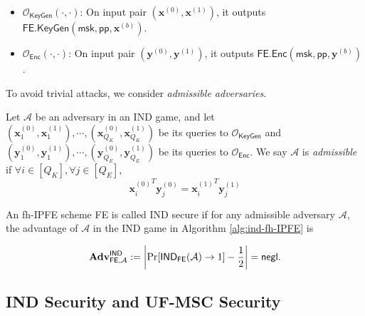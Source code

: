 \begin{itemize}

	\item $\mathcal{O}_{\textsf{KeyGen}}(\cdot, \cdot)$: On input pair $(\mathbf{x}^{(0)}, \mathbf{x}^{(1)})$, it outputs $\textsf{FE.KeyGen}(\textsf{msk}, \textsf{pp}, \mathbf{x}^{(b)} )$.

	\item $\mathcal{O}_{\textsf{Enc}}(\cdot, \cdot)$: On input pair $(\mathbf{y}^{(0)}, \mathbf{y}^{(1)})$, it outputs $\textsf{FE.Enc}(\textsf{msk}, \textsf{pp}, \mathbf{y}^{(b)} )$.

\end{itemize}

\noindent To avoid trivial attacks, we consider \emph{admissible adversaries}.

\begin{definition}

	Let $\mathcal{A}$ be an adversary in an \textsf{IND} game, and let $ (\mathbf{x}_1^{(0)}, \mathbf{x}_1^{(1)}), \cdots, (\mathbf{x}_{Q_K}^{(0)}, \mathbf{x}_{Q_K}^{(1)})$ be its queries to $\mathcal{O}_{\textsf{KeyGen}}$ and $(\mathbf{y}_1^{(0)}, \mathbf{y}_1^{(1)}), \cdots, (\mathbf{y}_{Q_E}^{(0)}, \mathbf{y}_{Q_E}^{(1)})$ be its queries to $\mathcal{O}_{\textsf{Enc}}$.
	We say $\mathcal{A}$ is \emph{admissible} if $\forall i \in [Q_K], \forall j \in [Q_E]$,
\[
	{\mathbf{x}^{(0)}_{i}}^T \mathbf{y}^{(0)}_{j} = {\mathbf{x}^{(1)}_{i}}^T \mathbf{y}^{(1)}_{j}
\]

\end{definition}



\begin{definition}

	An fh-IPFE scheme \textsf{FE} is called IND secure if for any admissible adversary $\mathcal{A}$, the advantage of $\mathcal{A}$ in the IND game in Algorithm \ref{alg:ind-fh-IPFE} is

\[
	\mathbf{Adv}_{\textsf{FE}, \mathcal{A}}^{\textsf{IND}} := \left| \Pr[\textsf{IND}_{\textsf{FE}}(\mathcal{A}) \to 1 ] - \frac{1}{2} \right| = \mathsf{negl}.
\]

\end{definition}


\subsection{IND Security and UF-MSC Security}
\label{sec:ind-uf-msc}

